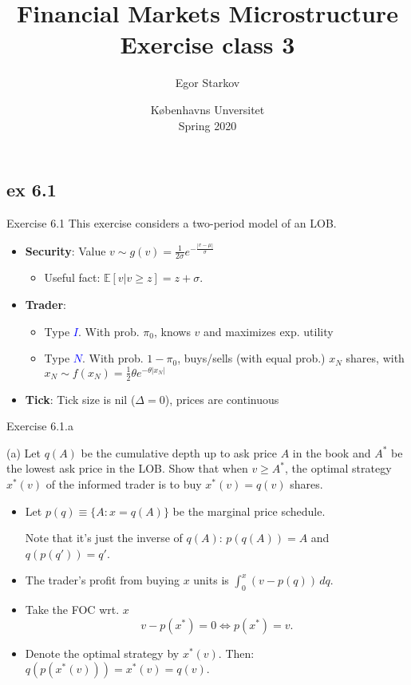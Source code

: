 \documentclass[english,10pt
,aspectratio=169
]{beamer}
\title{Financial Markets Microstructure \\ Exercise class 3}
\author{Egor Starkov}
\date{K{\o}benhavns Unversitet \\
	Spring 2020}
\begin{document}
\subsection{ex 6.1}

\begin{frame}[label=ex1]{Exercise 6.1}
	This exercise considers a two-period model of an LOB.
	\begin{itemize}
		\item \textbf{Security}: Value $v \sim g(v)=\frac{1}{2\sigma} e^{-\frac{|v-\mu|}{\sigma}}$
		\begin{itemize}
			\item Useful fact: $\mathbb{E}[v|v \ge z]=z+\sigma$.
		\end{itemize}
		\item \textbf{Trader}: 
		\begin{itemize}
			\item Type \textcolor{blue}{$I$}. With prob. $\pi_0$, knows $v$ and maximizes exp. utility
			\item Type \textcolor{blue}{$N$}. With prob. $1-\pi_0$, buys/sells (with equal prob.) $x_N$ shares, with $x_N \sim f(x_N)=\frac{1}{2}\theta e^{-\theta |x_N|}$ 
		\end{itemize}
		\item \textbf{Tick}: Tick size is nil ($\Delta=0$), prices are continuous
	\end{itemize}
\end{frame}


\begin{frame}{Exercise 6.1.a}
	\begin{exampleblock}{}
		(a) Let $q(A)$ be the cumulative depth up to ask price $A$ in the book and $A^*$ be the lowest ask price in the LOB. Show that when $v \ge A^*$, the optimal strategy $x^*(v)$ of the informed trader is to buy $x^*(v)=q(v)$ shares.
	\end{exampleblock}

	\pause

	\begin{itemize}
		\item Let $p(q) \equiv \{A: x=q(A)\}$ be the marginal price schedule.
		
		Note that it's just the inverse of $q(A)$: $p(q(A)) = A$ and $q(p(q'))=q'$.
		\item The trader's profit from buying $x$ units is $\int_0^x (v-p(q)) \, dq.$
		\item Take the FOC wrt. $x$
		\[
		v-p(x^*)=0 \Leftrightarrow p(x^*)=v.
		\]
		\item Denote the optimal strategy by $x^*(v)$. Then:
		$q(p(x^*(v)))=x^*(v)=q(v)$.
	\end{itemize}
\end{frame}
\end{document}
